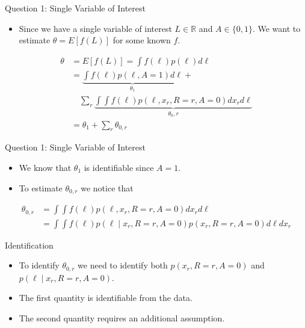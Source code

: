 \documentclass{beamer} %
\newcommand{\R}{\ensuremath{\mathbb{R}}}
\begin{document}
\begin{frame}{Question 1: Single Variable of Interest}
  \begin{itemize}
    \item Since we have a single variable of interest $L \in \R$ and 
      $A \in \{0, 1\}$. We want to estimate $\theta = E[f(L)]$ for some 
      known $f$.
  \end{itemize}

  \begin{align*}
    \theta &= E[f(L)] = \int f(\ell)p(\ell)d\ell \\ 
    &= \underbrace{\int f(\ell)p(\ell, A = 1) d\ell}_{\theta_1} +\\ 
    &\quad
    \sum_r \underbrace{\int \int f(\ell)p(\ell, x_r, R= r, A = 0) dx_r d\ell}_{\theta_0, r} \\
    &= \theta_1 + \sum_r \theta_{0,r}
  \end{align*}
\end{frame}

\begin{frame}{Question 1: Single Variable of Interest}
  \begin{itemize}
    \item We know that $\theta_1$ is identifiable since $A = 1$.
    \item To estimate $\theta_{0, r}$ we notice that
  \end{itemize}

  \begin{align*}
    \theta_{0,r} 
    &= \int \int f(\ell)p(\ell, x_r, R = r, A = 0) dx_r d\ell \\ 
    &= \int \int f(\ell)p(\ell \mid x_r, R = r, A = 0) p(x_r, R = r, A = 0) d\ell dx_r
  \end{align*}
\end{frame}

\begin{frame}{Identification}
  \begin{itemize}
    \item To identify $\theta_{0,r}$ we need to identify both $p(x_r, R = r, A =
      0)$ and $p(\ell \mid x_r, R = r, A = 0)$.
    \item The first quantity is identifiable from the data.
    \item The second quantity requires an additional assumption.
  \end{itemize}
\end{frame}
\end{document}
